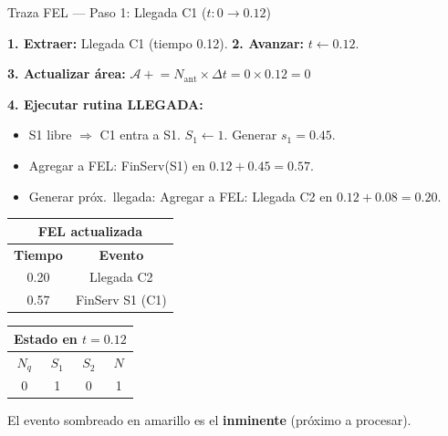 \documentclass[aspectratio=1610, 9pt]{beamer}
\begin{document}
\begin{frame}{Traza FEL --- Paso 1: Llegada C1 ($t: 0 \to 0.12$)}

\textbf{1. Extraer:} Llegada C1 (tiempo 0.12). \quad \textbf{2. Avanzar:} $t \leftarrow 0.12$.

\textbf{3. Actualizar área:} $\mathcal{A} \mathrel{+}= N_{\text{ant}} \times \Delta t = 0 \times 0.12 = 0$

\textbf{4. Ejecutar rutina LLEGADA:}
\begin{itemize}
    \item S1 libre $\Rightarrow$ C1 entra a S1. $S_1 \leftarrow 1$. Generar $s_1 = 0.45$.
    \item \textcolor{verdeoscuro}{Agregar a FEL:} FinServ(S1) en $0.12 + 0.45 = 0.57$.
    \item Generar próx.\ llegada: \textcolor{verdeoscuro}{Agregar a FEL:} Llegada C2 en $0.12 + 0.08 = 0.20$.
\end{itemize}

\vspace{0.15cm}
\begin{center}
\renewcommand{\arraystretch}{1.3}
\begin{tabular}{|c|c|}
\hline
\multicolumn{2}{|c|}{\cellcolor{azuloscuro!15}\textbf{FEL actualizada}} \\
\hline
\textbf{Tiempo} & \textbf{Evento} \\
\hline
\rowcolor{yellow!20} 0.20 & Llegada C2 \\
0.57 & FinServ S1 (C1) \\
\hline
\end{tabular}
\hspace{1.5cm}
\begin{tabular}{|c|c|c|c|}
\hline
\multicolumn{4}{|c|}{\cellcolor{grisclaro}\textbf{Estado en $t=0.12$}} \\
\hline
$N_q$ & $S_1$ & $S_2$ & $N$ \\
\hline
0 & \cellcolor{blue!15}1 & 0 & 1 \\
\hline
\end{tabular}
\end{center}

\small El evento sombreado en amarillo es el \textbf{inminente} (próximo a procesar).
\end{frame}
\end{document}
